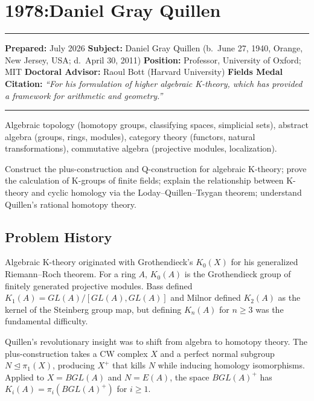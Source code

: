 \chapter{1978:Daniel Gray Quillen}\label{ch1978danielg.quillen:daniel-gray-quillen-fields-medal-1978-a-comprehensive-report-on-his-work-and-impact}

\begin{center}\rule{0.5\linewidth}{0.5pt}\end{center}

\textbf{Prepared:} July 2026 \textbf{Subject:} Daniel Gray Quillen (b.\
June 27, 1940, Orange, New Jersey, USA; d.~April 30, 2011)
\textbf{Position:} Professor, University of Oxford; MIT
\textbf{Doctoral Advisor:} Raoul Bott (Harvard University)
\textbf{Fields Medal Citation:} \emph{``For his formulation of higher
algebraic K-theory, which has provided a framework for arithmetic and
geometry.''}

\begin{center}\rule{0.5\linewidth}{0.5pt}\end{center}

\begin{prereqs} Algebraic topology (homotopy groups, classifying spaces,
simplicial sets), abstract algebra (groups, rings, modules), category
theory (functors, natural transformations), commutative algebra
(projective modules, localization). \end{prereqs}

\begin{objectives} Construct the plus-construction and Q-construction
for algebraic K-theory; prove the calculation of K-groups of finite
fields; explain the relationship between K-theory and cyclic homology
via the Loday--Quillen--Tsygan theorem; understand Quillen's rational
homotopy theory.
\end{objectives}

\section{Problem History}

Algebraic K-theory originated with Grothendieck's $K_0(X)$ for his
generalized Riemann--Roch theorem. For a ring $A$, $K_0(A)$ is the
Grothendieck group of finitely generated projective modules. Bass
defined $K_1(A) = GL(A)/[GL(A),GL(A)]$ and Milnor defined $K_2(A)$ as
the kernel of the Steinberg group map, but defining $K_n(A)$ for
$n \ge 3$ was the fundamental difficulty.

Quillen's revolutionary insight was to shift from algebra to homotopy
theory. The plus-construction takes a CW complex $X$ and a perfect
normal subgroup $N \unlhd \pi_1(X)$, producing $X^+$ that kills $N$
while inducing homology isomorphisms. Applied to $X = BGL(A)$ and
$N = E(A)$, the space $BGL(A)^+$ has
$K_i(A) = \pi_i(BGL(A)^+)$ for $i \ge 1$.


